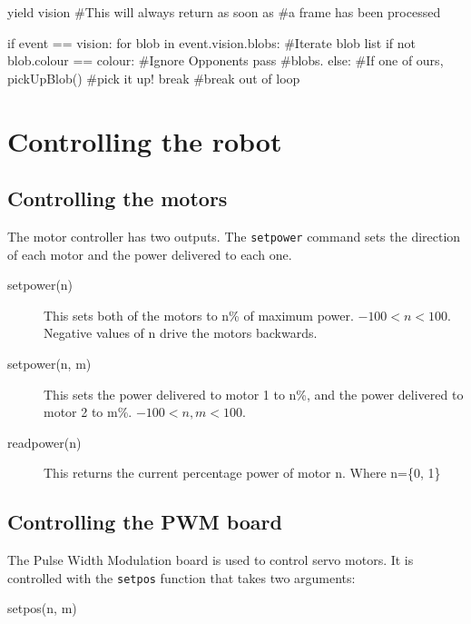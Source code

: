 \documentclass[a4paper, 12pt]{article}
\begin{document}
\begin{python}
\begin{verbatimtab}
yield vision    #This will always return as soon as
                #a frame has been processed

if event == vision:
	for blob in event.vision.blobs: 	#Iterate blob list 
        	if not blob.colour == colour:  	#Ignore Opponents  
                	pass			#blobs.
		else:				#If one of ours,
			pickUpBlob()           	#pick it up!
			break			#break out of loop
\end{verbatimtab}
\end{python}


\section{Controlling the robot}
\subsection{Controlling the motors}
The motor controller has two outputs.  The \texttt{setpower} command
sets the direction of each motor and the power delivered to each one.

\begin{description}
\item[setpower(n)] This sets both of the motors to n\% of maximum
power.  $-100<n<100$. Negative values of n drive the motors backwards.
\item[setpower(n, m)] This sets the power delivered to motor 1 to n\%,
  and the power delivered to motor 2 to m\%. $-100<n,m<100$.
\item[readpower(n)] This returns the current percentage power of motor n. Where n=\{0, 1\} 
\end{description}

\vspace{12pt}


\subsection{Controlling the PWM board}
The Pulse Width Modulation board is used to control servo motors.  It is
controlled with the \texttt{setpos} function that takes two arguments:

\begin{verbatimtab}
setpos(n, m)
\end{verbatimtab}
\end{document}
